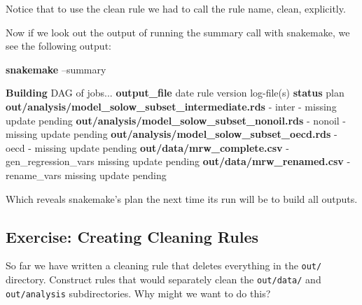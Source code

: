 \documentclass[]{book}
\newenvironment{Shaded}{\begin{snugshade}}{\end{snugshade}}
\newcommand{\KeywordTok}[1]{\textcolor[rgb]{0.13,0.29,0.53}{\textbf{{#1}}}}
\newcommand{\NormalTok}[1]{{#1}}
\theoremstyle{definition}
\theoremstyle{definition}
\theoremstyle{definition}
\theoremstyle{remark}
\begin{document}
\begin{Shaded}
\end{Shaded}

Notice that to use the clean rule we had to call the rule name, clean,
explicitly.

Now if we look out the output of running the summary call with
snakemake, we see the following output:

\begin{Shaded}
\begin{Highlighting}[]
\KeywordTok{snakemake} \NormalTok{--summary}
\end{Highlighting}
\end{Shaded}

\begin{Shaded}
\begin{Highlighting}[]
\KeywordTok{Building} \NormalTok{DAG of jobs...}
\KeywordTok{output_file}                                        \NormalTok{date   rule  version log-file(s)     }\KeywordTok{status}  \NormalTok{plan}
\KeywordTok{out/analysis/model_solow_subset_intermediate.rds}    \NormalTok{-     inter        -                missing update pending}
\KeywordTok{out/analysis/model_solow_subset_nonoil.rds}          \NormalTok{-     nonoil       -                missing update pending}
\KeywordTok{out/analysis/model_solow_subset_oecd.rds}            \NormalTok{-     oecd         -                missing update pending}
\KeywordTok{out/data/mrw_complete.csv}                           \NormalTok{-     gen_regression_vars           missing update pending}
\KeywordTok{out/data/mrw_renamed.csv}                            \NormalTok{-     rename_vars                   missing update pending}
\end{Highlighting}
\end{Shaded}

Which reveals snakemake's plan the next time its run will be to build
all outputs.

\subsection*{Exercise: Creating Cleaning
Rules}\label{exercise-creating-cleaning-rules}

So far we have written a cleaning rule that deletes everything in the
\texttt{out/} directory. Construct rules that would separately clean the
\texttt{out/data/} and \texttt{out/analysis} subdirectories. Why might
we want to do this?
\end{document}
